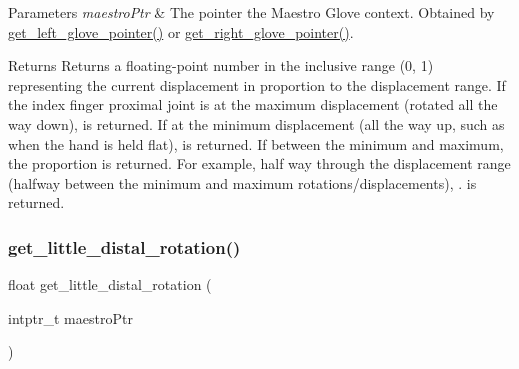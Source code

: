 \begin{DoxyParams}{Parameters}
{\em maestro\+Ptr} & The pointer the Maestro Glove context. Obtained by \hyperlink{group__glove_management_ga63ce3c99d4a8b8db851b22af9185764e}{get\+\_\+left\+\_\+glove\+\_\+pointer()} or \hyperlink{group__glove_management_ga9b8fd9d91aeac3f8da50f7a7eba0c32b}{get\+\_\+right\+\_\+glove\+\_\+pointer()}. \\
\hline
\end{DoxyParams}
\begin{DoxyReturn}{Returns}
Returns a floating-\/point number in the inclusive range {\ttfamily (0, 1)} representing the current displacement in proportion to the displacement range. If the index finger proximal joint is at the maximum displacement (rotated all the way down), {} is returned. If at the minimum displacement (all the way up, such as when the hand is held flat), {} is returned. If between the minimum and maximum, the proportion is returned. For example, half way through the displacement range (halfway between the minimum and maximum rotations/displacements), {.} is returned. 
\end{DoxyReturn}
\mbox{\label{group__rotation_access_ga4e5835f8eae4b89728219b50ff20259b}} 
\subsubsection{\texorpdfstring{get\+\_\+little\+\_\+distal\+\_\+rotation()}{get\_little\_distal\_rotation()}}
{\footnotesize\ttfamily float get\+\_\+little\+\_\+distal\+\_\+rotation (\begin{DoxyParamCaption}\item[{intptr\+\_\+t}]{maestro\+Ptr }\end{DoxyParamCaption})}


